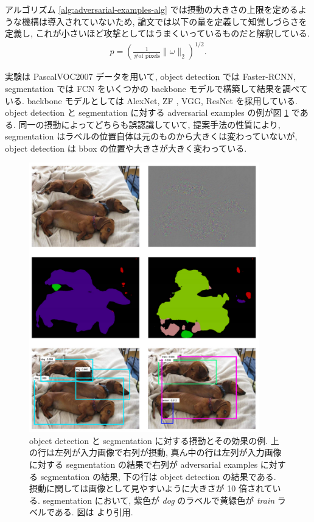 アルゴリズム \ref{alg:adversarial-examples-alg} では摂動の大きさの上限を定めるような機構は導入されていないため, 論文では以下の量を定義して知覚しづらさを定義し, これが小さいほど攻撃としてはうまくいっているものだと解釈している.
%
\begin{eqnarray}
p = \left( \frac{1}{\text{\# of pixels}} \| \omega \|_2 \right)^{1/2}.
\label{eq:adversarial-examples-imperceptibility}
\end{eqnarray}
%

実験は PascalVOC2007 データを用いて, object detection では Faster-RCNN, segmentation では FCN をいくつかの backbone モデルで構築して結果を調べている.
backbone モデルとしては AlexNet, ZF \cite{zeiler2014visualizing}, VGG, ResNet を採用している.
object detection と segmentation に対する adversarial examples の例が図 \ref{fig:adversarial-examples-example} である.
同一の摂動によってどちらも誤認識していて, 提案手法の性質により, segmentation はラベルの位置自体は元のものから大きくは変わっていないが, object detection は bbox の位置や大きさが大きく変わっている.
%
\begin{figure}[htbp]
\begin{center}
\includegraphics[width=10.0cm]{figures/adversarial-examples-example.pdf}
\end{center}
\caption{
object detection と segmentation に対する摂動とその効果の例.
上の行は左列が入力画像で右列が摂動, 真ん中の行は左列が入力画像に対する segmentation の結果で右列が adversarial examples に対する segmentation の結果, 下の行は object detection の結果である.
摂動に関しては画像として見やすいように大きさが 10 倍されている.
segmentation において, 紫色が {\it dog} のラベルで黄緑色が {\it train} ラベルである.
図は \cite{xie2017adversarial} より引用.
}
\label{fig:adversarial-examples-example}
\end{figure}
%

